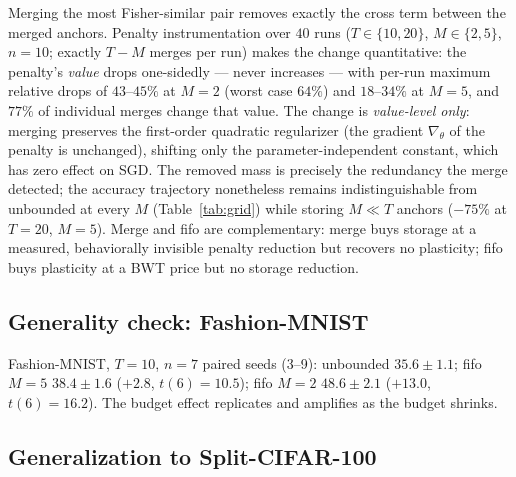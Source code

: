 \documentclass[review,12pt,number]{elsarticle}
\begin{document}
Merging the most Fisher-similar pair removes exactly the cross term
between the merged anchors. Penalty instrumentation over $40$ runs
($T \in \{10,20\}$, $M \in \{2,5\}$, $n{=}10$; exactly $T{-}M$ merges
per run) makes the change quantitative: the penalty's \emph{value} drops
one-sidedly --- never increases --- with per-run maximum relative
drops of $43$--$45\%$ at $M{=}2$ (worst case $64\%$) and $18$--$34\%$
at $M{=}5$, and $77\%$ of individual merges change that value. The
change is \emph{value-level only}: merging preserves the first-order
quadratic regularizer (the gradient $\nabla_\theta$ of the penalty is
unchanged), shifting only the parameter-independent constant, which
has zero effect on SGD. The removed mass is precisely the redundancy
the merge detected; the
accuracy trajectory nonetheless remains indistinguishable from
unbounded at every $M$ (Table~\ref{tab:grid}) while storing
$M \ll T$ anchors ($-75\%$ at $T{=}20$, $M{=}5$).
Merge and fifo are complementary: merge buys storage at a measured,
behaviorally invisible penalty reduction but recovers no plasticity;
fifo buys plasticity at a BWT price but no storage reduction.

\subsection{Generality check: Fashion-MNIST}
\label{sec:exp-fashion}

Fashion-MNIST, $T{=}10$, $n{=}7$ paired seeds (3--9): unbounded
$35.6\pm1.1$; fifo $M{=}5$ $38.4\pm1.6$ ($+2.8$, $t(6){=}10.5$); fifo
$M{=}2$ $48.6\pm2.1$ ($+13.0$, $t(6){=}16.2$). The budget
effect replicates and amplifies as the budget shrinks.

\subsection{Generalization to Split-CIFAR-100}
\label{sec:exp-cifar}
\end{document}
